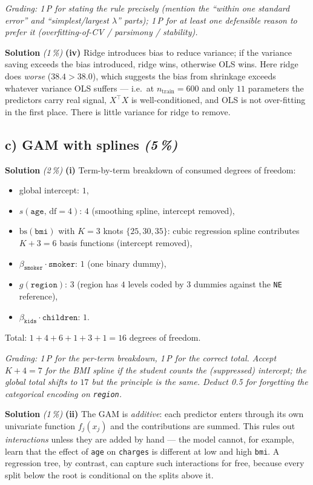 \documentclass[11pt,a4paper]{article}
\newcommand{\subpoints}[1]{\textit{(#1\,\%)}}
\newcommand{\sol}{\noindent\textbf{Solution}}
\begin{document}
\noindent\emph{Grading: 1\,P for stating the rule precisely (mention the ``within one standard
error'' \emph{and} ``simplest/largest $\lambda$'' parts); 1\,P for at least one defensible
reason to prefer it (overfitting-of-CV / parsimony / stability).}

\medskip
\sol{} \subpoints{1} \textbf{(iv)} Ridge introduces bias to reduce variance; if the variance
saving exceeds the bias introduced, ridge wins, otherwise OLS wins. Here ridge does \emph{worse}
($38.4 > 38.0$), which suggests the bias from shrinkage exceeds whatever variance OLS suffers ---
i.e.\ at $n_{\text{train}}=600$ and only $11$ parameters the predictors carry real signal,
$X^\top X$ is well-conditioned, and OLS is not over-fitting in the first place. There is little
variance for ridge to remove.

\subsection*{c) GAM with splines \subpoints{5}}

\sol{} \subpoints{2} \textbf{(i)} Term-by-term breakdown of consumed degrees of freedom:
\begin{itemize}
  \item global intercept: $1$,
  \item $s(\texttt{age},\,\mathrm{df}=4)$: $4$ (smoothing spline, intercept removed),
  \item $\mathrm{bs}(\texttt{bmi})$ with $K=3$ knots $\{25,30,35\}$: cubic regression spline
        contributes $K+3 = 6$ basis functions (intercept removed),
  \item $\beta_{\texttt{smoker}}\cdot\texttt{smoker}$: $1$ (one binary dummy),
  \item $g(\texttt{region})$: $3$ (region has $4$ levels coded by $3$ dummies against the
        \texttt{NE} reference),
  \item $\beta_{\texttt{kids}}\cdot\texttt{children}$: $1$.
\end{itemize}
Total: $1 + 4 + 6 + 1 + 3 + 1 = \boxed{16}$ degrees of freedom.

\noindent\emph{Grading: 1\,P for the per-term breakdown, 1\,P for the correct total. Accept
$K+4=7$ for the BMI spline if the student counts the (suppressed) intercept; the global total
shifts to $17$ but the principle is the same. Deduct 0.5 for forgetting the categorical encoding
on \texttt{region}.}

\medskip
\sol{} \subpoints{1} \textbf{(ii)} The GAM is \emph{additive}: each predictor enters through its
own univariate function $f_j(x_j)$ and the contributions are summed. This rules out
\emph{interactions} unless they are added by hand --- the model cannot, for example, learn that
the effect of \texttt{age} on \texttt{charges} is different at low and high \texttt{bmi}. A
regression tree, by contrast, can capture such interactions for free, because every split below
the root is conditional on the splits above it.
\end{document}
